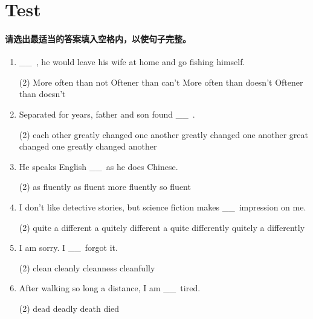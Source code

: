 \documentclass{yufa}
\newcommand\ttu{ \_\_\ }
\begin{document}
\section{Test}

\paragraph{请选出最适当的答案填入空格内，以使句子完整。}

\begin{enumerate}
\item \ttu, he would leave his wife at home and go fishing himself.
  \begin{tasks}(2)
    \task More often than not
    \task Oftener than can't
    \task More often than doesn't
    \task Oftener than doesn't
  \end{tasks}

\item Separated for years, father and son found \ttu.
  \begin{tasks}(2)
    \task each other greatly changed
    \task one another greatly changed
    \task one another great changed
    \task one greatly changed another
  \end{tasks}

\item He speaks English \ttu as he does Chinese.
  \begin{tasks}(2)
    \task as fluently
    \task as fluent
    \task more fluently
    \task so fluent
  \end{tasks}

\item I don't like detective stories, but science fiction makes \ttu impression on me.
  \begin{tasks}(2)
    \task quite a different
    \task a quitely different
    \task a quite differently
    \task quitely a differently
  \end{tasks}

\item I am sorry. I \ttu forgot it.
  \begin{tasks}(2)
    \task clean
    \task cleanly
    \task cleanness
    \task cleanfully
  \end{tasks}

\item After walking so long a distance, I am \ttu tired.
  \begin{tasks}(2)
    \task dead
    \task deadly
    \task death
    \task died
  \end{tasks}


\end{enumerate}
\end{document}
